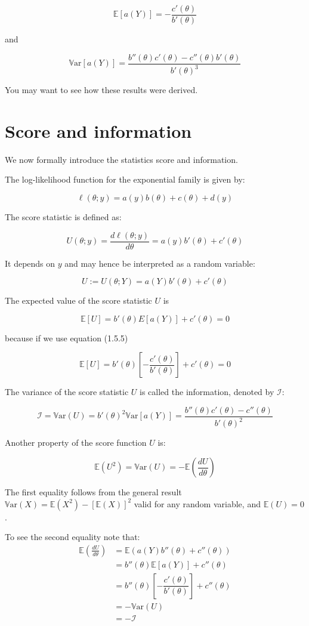 \documentclass[11pt]{article}
\begin{document}
\begin{enumerate}
\[\mathbb{E}[a(Y)] = -\frac{c'(\theta)}{b'(\theta)}\]

and

\[\mathbb{V}\text{ar}[a(Y)] = \frac{b''(\theta)c'(\theta) - c''(\theta)b'(\theta)}{b'(\theta)^3}\]

You may want to see how these results were derived.

\section{Score and information}

We now formally introduce the statistics score and information.

The log-likelihood function for the exponential family is given by:

\[\ell(\theta; y) = a(y)b(\theta) + c(\theta) + d(y)\]

The score statistic is defined as:

\[U(\theta; y) = \frac{d\ell(\theta; y)}{d\theta} = a(y)b'(\theta) + c'(\theta)\]

It depends on \( y \) and may hence be interpreted as a random variable:

\[U := U(\theta; Y) = a(Y)b'(\theta) + c'(\theta)\]

The expected value of the score statistic \(U\) is

\[\mathbb{E}[U] = b'(\theta)E[a(Y)] + c'(\theta) = 0\]

because if we use equation (1.5.5)

\[\mathbb{E}[U] = b'(\theta) \left[-\frac{c'(\theta)}{b'(\theta)}\right] + c'(\theta) = 0\]

The variance of the score statistic \(U\) is called the information, denoted by \(\mathcal{I}\):

\[\mathcal{I} = \mathbb{V}\text{ar}(U) = b'(\theta)^2\mathbb{V}\text{ar}[a(Y)] = \frac{b''(\theta)c'(\theta) - c''(\theta)}{b'(\theta)^2}\]

Another property of the score function \(U\) is:

\[\mathbb{E}(U^2) = \mathbb{V}\text{ar}(U) = - \mathbb{E} \left(\frac{dU}{d\theta}\right)\]

The first equality follows from the general result \(\mathbb{V}\text{ar}(X) = \mathbb{E}(X^2) - [\mathbb{E}(X)]^2\) valid for any random variable, and \(\mathbb{E}(U) = 0\).

To see the second equality note that:
\begin{align}
    \mathbb{E} \left(\frac{dU}{dθ}\right) &= \mathbb{E} \left(a(Y)b''(\theta) + c''(\theta)\right) \nonumber \\
    &= b''(\theta)\mathbb{E}[a(Y)] + c''(\theta) \nonumber \\
    &= b'' (\theta) \left[-\dfrac{c'(\theta)}{b'(\theta)}\right] + c''(\theta) \nonumber \\
    &= -\mathbb{V}\text{ar}(U) \nonumber \\
    &= -\mathcal{I} \nonumber
\end{align}


\end{enumerate}
\end{document}
